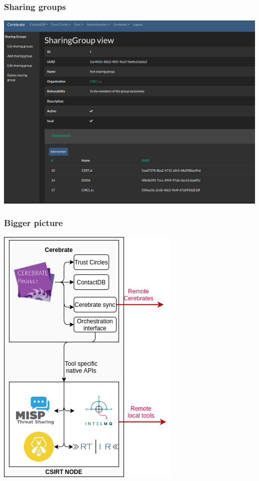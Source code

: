 \begin{frame}
\frametitle{Sharing groups}
\begin{center}
    \includegraphics[scale=0.25]{sharing_group.png}
\end{center}
\end{frame}

\begin{frame}
\frametitle{Bigger picture}
\begin{center}
    \includegraphics[scale=0.4]{Goals.png}
\end{center}
\end{frame}

